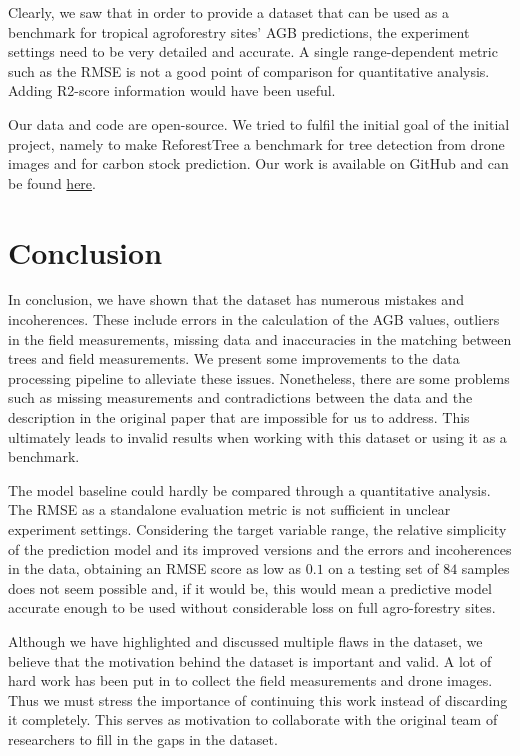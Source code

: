 \documentclass[10pt,twocolumn,letterpaper]{article}
\begin{document}
Clearly, we saw that in order to provide a dataset that can be used as a benchmark for tropical agroforestry sites' AGB predictions, the experiment settings need to be very detailed and accurate. A single range-dependent metric such as the RMSE is not a good point of comparison for quantitative analysis. Adding R2-score information would have been useful.

Our data and code are open-source. We tried to fulfil the initial goal of the initial project, namely to make ReforestTree a benchmark for tree detection from drone images and for carbon stock prediction. Our work is available on GitHub and can be found \href{https://github.com/Silviug-Nss/ReforesTree-Remastered}{here}.

\section{Conclusion}
\label{sec:conclussion}
In conclusion, we have shown that the dataset has numerous mistakes and incoherences.
These include errors in the calculation of the AGB values, outliers in the field measurements, missing data and inaccuracies in the matching between trees and field measurements.
We present some improvements to the data processing pipeline to alleviate these issues.
Nonetheless, there are some problems such as missing measurements and contradictions between the data and the description in the original paper that are impossible for us to address.
This ultimately leads to invalid results when working with this dataset or using it as a benchmark.

The model baseline could hardly be compared through a quantitative analysis. The RMSE as a standalone evaluation metric is not sufficient in unclear experiment settings. Considering the target variable range, the relative simplicity of the prediction model and its improved versions and the errors and incoherences in the data, obtaining an RMSE score as low as $0.1$ on a testing set of $84$ samples does not seem possible and, if it would be, this would mean a predictive model accurate enough to be used without considerable loss on full agro-forestry sites.

Although we have highlighted and discussed multiple flaws in the dataset, we believe that the motivation behind the dataset is important and valid.
A lot of hard work has been put in to collect the field measurements and drone images.
Thus we must stress the importance of continuing this work instead of discarding it completely.
This serves as motivation to collaborate with the original team of researchers to fill in the gaps in the dataset.


{\small


}
\end{document}
